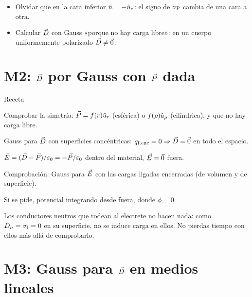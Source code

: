 \begin{trampa}
\begin{itemize}
  \item Olvidar que en la cara inferior $\hat n=-\hat u_{z}$: el signo de $\sigma_{\mathrm P}$ cambia de una cara a otra.
  \item Calcular $\vec D$ con Gauss «porque no hay carga libre»: en un cuerpo uniformemente polarizado $\vec D\neq\vec 0$.
\end{itemize}
\end{trampa}

\section{M2: $\vec D$ por Gauss con $\vec P$ dada}\label{gsec:m2}

\begin{metodo}{Receta}
\begin{pasos}
  \item Comprobar la simetría: $\vec P=f(r)\hat u_{r}$ (esférica) o $f(\rho)\hat u_{\rho}$ (cilíndrica), y que no hay carga libre.
  \item Gauss para $\vec D$ con superficies concéntricas: $q_{\mathrm{f,enc}}=0\Rightarrow\vec D=\vec 0$ en todo el espacio.
  \item $\vec E=(\vec D-\vec P)/\varepsilon_0=-\vec P/\varepsilon_0$ dentro del material, $\vec E=\vec 0$ fuera.
  \item Comprobación: Gauss para $\vec E$ con las cargas ligadas encerradas (de volumen y de superficie).
  \item Si se pide, potencial integrando desde fuera, donde $\phi=0$.
\end{pasos}
\end{metodo}

\begin{consejo}
Los conductores neutros que rodean al electrete no hacen nada: como $D_n=\sigma_{\mathrm f}=0$ en su superficie, no se induce carga
en ellos. No pierdas tiempo con ellos más allá de comprobarlo.
\end{consejo}

\section{M3: Gauss para $\vec D$ en medios lineales}\label{gsec:m3}

